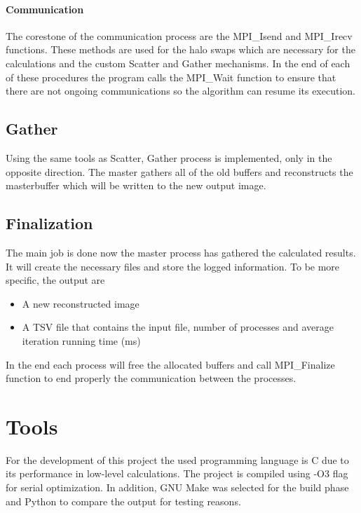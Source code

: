 \documentclass[12pt,a4paper]{article}
\newcommand{\sectionVspacing}{\vspace{15pt}}
\begin{document}
        \paragraph{Communication}
            The corestone of the communication process are the MPI\_Isend and MPI\_Irecv functions. These methods are used for the halo swaps which are necessary for the calculations and the custom Scatter and Gather mechanisms. In the end of each of these procedures the program calls the MPI\_Wait function to ensure that there are not ongoing communications so the algorithm can resume its execution.

    \subsection{Gather}
    	Using the same tools as Scatter, Gather process is implemented, only in the opposite direction. The master gathers all of the old buffers and reconstructs the masterbuffer which will be written to the new output image.

    \subsection{Finalization}
    	The main job is done now the master process has gathered the calculated results. It will create the necessary files and store the logged information. To be more specific, the output are

      \begin{itemize}
		    \item A new reconstructed image
		    \item A TSV file that contains the input file, number of processes and average iteration running time (ms)
		  \end{itemize}

    	In the end each process will free the allocated buffers and call MPI\_Finalize function to end properly the communication between the processes.

\sectionVspacing
\clearpage

\section{Tools}
	For the development of this project the used programming language is C due to its performance in low-level calculations. The project is compiled using -O3 flag for serial optimization. In addition, GNU Make was selected for the build phase and Python to compare the output for testing reasons.
	
\end{document}
